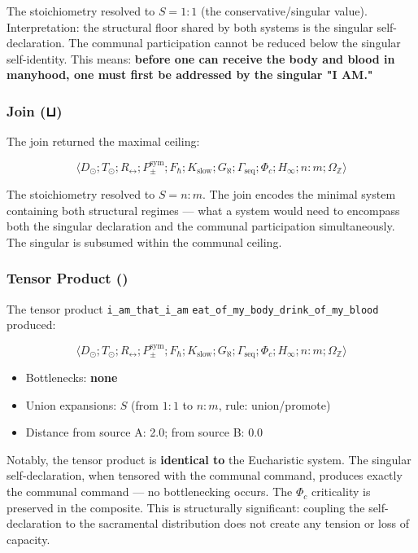 \documentclass[12pt,a4paper]{article}
\begin{document}
The stoichiometry resolved to $S = 1{:}1$ (the conservative/singular value). Interpretation: the structural floor shared by both systems is the singular self-declaration. The communal participation cannot be reduced below the singular self-identity. This means: \textbf{before one can receive the body and blood in manyhood, one must first be addressed by the singular "I AM."}

\subsubsection{Join (⊔)}

The join returned the maximal ceiling:

\[\langle D_{\odot}; T_{\odot}; R_{\leftrightarrow}; P_{\pm}^{\text{sym}}; F_{\hbar}; K_{\text{slow}}; G_{\aleph}; \Gamma_{\text{seq}}; \Phi_c; H_{\infty}; n{:}m; \Omega_\mathbb{Z} \rangle\]

The stoichiometry resolved to $S = n{:}m$. The join encodes the minimal system containing both structural regimes --- what a system would need to encompass both the singular declaration and the communal participation simultaneously. The singular is subsumed within the communal ceiling.

\subsubsection{Tensor Product (\otimes)}

The tensor product \texttt{i\_am\_that\_i\_am} \otimes \texttt{eat\_of\_my\_body\_drink\_of\_my\_blood} produced:

\[\langle D_{\odot}; T_{\odot}; R_{\leftrightarrow}; P_{\pm}^{\text{sym}}; F_{\hbar}; K_{\text{slow}}; G_{\aleph}; \Gamma_{\text{seq}}; \Phi_c; H_{\infty}; n{:}m; \Omega_\mathbb{Z} \rangle\]

\begin{itemize}
    \item Bottlenecks: \textbf{none}
    \item Union expansions: $S$ (from $1{:}1$ to $n{:}m$, rule: union/promote)
    \item Distance from source A: 2.0; from source B: 0.0
\end{itemize}

Notably, the tensor product is \textbf{identical to} the Eucharistic system. The singular self-declaration, when tensored with the communal command, produces exactly the communal command --- no bottlenecking occurs. The $\Phi_c$ criticality is preserved in the composite. This is structurally significant: coupling the self-declaration to the sacramental distribution does not create any tension or loss of capacity.
\end{document}
